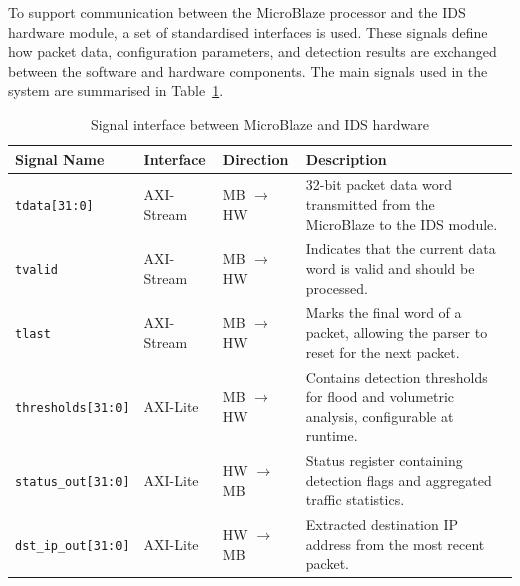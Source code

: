 To support communication between the MicroBlaze processor and the IDS
hardware module, a set of standardised interfaces is used. These signals
define how packet data, configuration parameters, and detection results
are exchanged between the software and hardware components. The main
signals used in the system are summarised in Table~\ref{tab:signal_interface}.

\begin{table}[H]
    \centering
    \caption{Signal interface between MicroBlaze and IDS hardware}
    \label{tab:signal_interface}
    \begin{tabular}{l l l p{7cm}}
        \hline
        \textbf{Signal Name}        & \textbf{Interface} & \textbf{Direction}  & \textbf{Description}                                                                      \\
        \hline

        \texttt{tdata[31:0]}        & AXI-Stream         & MB $\rightarrow$ HW & 32-bit packet data word transmitted from the MicroBlaze to the IDS module.                \\

        \texttt{tvalid}             & AXI-Stream         & MB $\rightarrow$ HW & Indicates that the current data word is valid and should be processed.                    \\

        \texttt{tlast}              & AXI-Stream         & MB $\rightarrow$ HW & Marks the final word of a packet, allowing the parser to reset for the next packet.       \\

        \texttt{thresholds[31:0]}   & AXI-Lite           & MB $\rightarrow$ HW & Contains detection thresholds for flood and volumetric analysis, configurable at runtime. \\

        \texttt{status\_out[31:0]}  & AXI-Lite           & HW $\rightarrow$ MB & Status register containing detection flags and aggregated traffic statistics.             \\

        \texttt{dst\_ip\_out[31:0]} & AXI-Lite           & HW $\rightarrow$ MB & Extracted destination IP address from the most recent packet.                             \\

        \hline
    \end{tabular}
\end{table}



